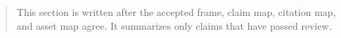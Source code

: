 \begin{abstract}
This section is written after the accepted frame, claim map, citation map, and
asset map agree. It summarizes only claims that have passed review.
\end{abstract}
